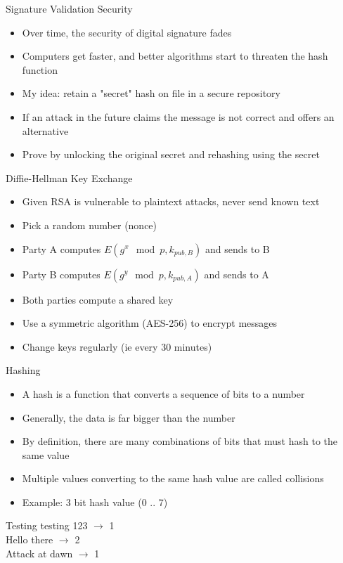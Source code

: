 \begin{frame}{Signature Validation Security}
    \begin{itemize}
        \item Over time, the security of digital signature fades
        \item Computers get faster, and better algorithms start to threaten the hash function
        \item My idea: retain a "secret" hash on file in a secure repository
        \item If an attack in the future claims the message is not correct and offers an alternative
        \item Prove by unlocking the original secret and rehashing using the secret
    \end{itemize}
\end{frame}

\begin{frame}{Diffie-Hellman Key Exchange}
    \begin{itemize}
        \item Given RSA is vulnerable to plaintext attacks, never send known text
        \item Pick a random number (nonce)
        \item Party A computes $E(g^x \mod p, k_{pub,B})$ and sends to B
        \item Party B computes $E(g^y \mod p, k_{pub,A})$ and sends to A
        \item Both parties compute a shared key
        \item Use a symmetric algorithm (AES-256) to encrypt messages
        \item Change keys regularly (ie every 30 minutes)
    \end{itemize}
\end{frame}

\begin{frame}{Hashing}
\begin{itemize}
    \item A hash is a function that converts a sequence of bits to a number
    \item Generally, the data is far bigger than the number
    \item By definition, there are many combinations of bits that must hash to the same value
    \item Multiple values converting to the same hash value are called collisions
    \item Example: 3 bit hash value (0 .. 7)
\end{itemize}
Testing testing 123 $\rightarrow$ 1 \\
Hello there $\rightarrow$ 2         \\
Attack at dawn $\rightarrow$ 1      \\
\end{frame}

